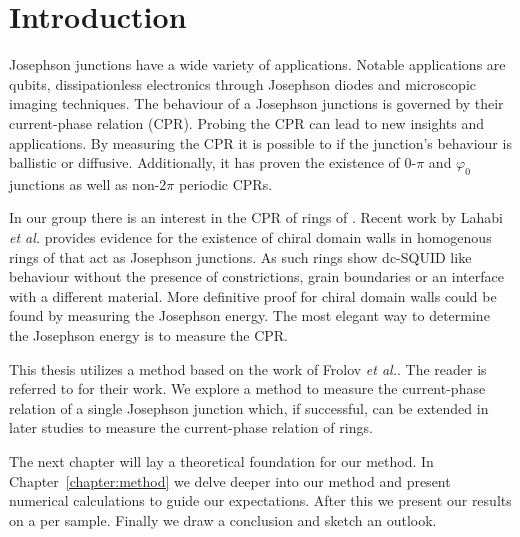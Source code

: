 \chapter{Introduction}
Josephson junctions have a wide variety of applications. Notable applications are qubits\cite{placeNewMaterialPlatform2021,pechenezhskiySuperconductingQuasichargeQubit2020}, dissipationless electronics through Josephson diodes\cite{zhangReconfigurableMagneticfieldfreeSuperconducting2023a,ciacciaGateTunableJosephson2023} and microscopic imaging techniques\cite{clarkeSQUIDHandbook2004,rogSQUIDontipMagneticMicroscopy2022,pranceSensitivityDCSQUID2023}. The behaviour of a Josephson junctions is governed by their current-phase relation (CPR). Probing the CPR can lead to new insights and applications. By measuring the CPR it is possible to if the junction's behaviour is ballistic or diffusive\cite{endresCurrentPhaseRelation2023,kayyalhaHighlySkewedCurrent2020}. Additionally, it has proven the existence of $0$-$\pi$ and $\varphi_0$ junctions\cite{frolovMeasurementCurrentPhaseRelation2004,muraniBallisticEdgeStates2017} as well as non-$2\pi$ periodic CPRs\cite{endresCurrentPhaseRelation2023}.

In our group there is an interest in the CPR of rings of . Recent work by Lahabi \textit{et al.} provides evidence for the existence of chiral domain walls in homogenous rings of \cite{lahabiSpintripletSupercurrentsOdd2018} that act as Josephson junctions. As such  rings show dc-SQUID like behaviour without the presence of constrictions, grain boundaries or an interface with a different material. More definitive proof for chiral domain walls could be found by measuring the Josephson energy\cite{lahabiSpintripletSupercurrentsOdd2018,sigristRoleDomainWalls1999}. The most elegant way to determine the Josephson energy is to measure the CPR.

This thesis utilizes a method based on the work of Frolov \textit{et al.}. The reader is referred to \cite{frolovMeasurementCurrentPhaseRelation2004,frolovCurrentphaseRelationsJosephson2005} for their work. We explore a method to measure the current-phase relation of a single Josephson junction which, if successful, can be extended in later studies to measure the current-phase relation of  rings.

The next chapter will lay a theoretical foundation for our method. In Chapter~\ref{chapter:method} we delve deeper into our method and present numerical calculations to guide our expectations. After this we present our results on a per sample. Finally we draw a conclusion and sketch an outlook.
